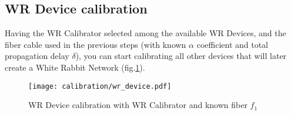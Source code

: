 \subsection{WR Device calibration} 
\label{subsec:devices}

Having the WR Calibrator selected among the available WR Devices, and the fiber
cable used in the previous steps (with known $\alpha$ coefficient and total
propagation delay $\delta$), you can start calibrating all other devices that
will later create a White Rabbit Network (fig.\ref{fig:devices}). 

\begin{figure}[ht]
	\begin{center}
		\texttt{[image: calibration/wr\_device.pdf]}
		\caption{WR Device calibration with WR Calibrator and known
		fiber $f_1$}
		\label{fig:devices}
	\end{center}
\end{figure}

